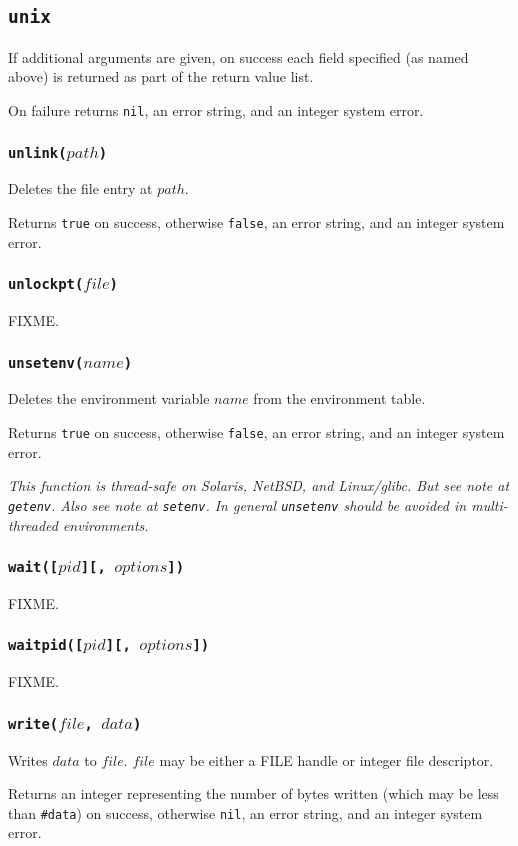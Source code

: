 \documentclass[11pt, oneside]{memoir}
\newcommand*{\true}[0]{\texttt{true}\xspace}
\newcommand*{\false}[0]{\texttt{false}\xspace}
\newcommand*{\nil}[0]{\texttt{nil}\xspace}
\newcommand*{\fn}[1]{\texttt{#1}\xspace}
\newcommand*{\otherwise}[1]{otherwise #1, an error string, and an integer system error}
\newcounter{toccols}
\newenvironment{Module}[1]{
	\subsection{\texttt{#1}}
	\addtocontents{toc}{
		\protect\begin{multicols}{\value{toccols}}
	}
}{
	\addtocontents{toc}{\protect\end{multicols}}
}
\begin{document}
\begin{Module}{unix}
If additional arguments are given, on success each field specified (as named above) is returned as part of the return value list.

On failure returns \nil, an error string, and an integer system error.

\subsubsection[\fn{unlink}]{\fn{unlink($path$)}}

Deletes the file entry at $path$.

Returns \true on success, otherwise \false, an error string, and an integer system error. 

\subsubsection[\fn{unlockpt}]{\fn{unlockpt($file$)}}

FIXME.

\subsubsection[\fn{unsetenv}]{\fn{unsetenv($name$)}}

Deletes the environment variable $name$ from the environment table.

Returns \true on success, otherwise \false, an error string, and an integer system error.

\emph{This function is thread-safe on Solaris, NetBSD, and Linux/glibc. But see note at \fn{getenv}. Also see note at \fn{setenv}. In general \fn{unsetenv} should be avoided in multi-threaded environments.}

\subsubsection[\fn{wait}]{\fn{wait([$pid$][, $options$])}}

FIXME.

\subsubsection[\fn{waitpid}]{\fn{waitpid([$pid$][, $options$])}}

FIXME.

\subsubsection[\fn{write}]{\fn{write($file$, $data$)}}

Writes $data$ to $file$. $file$ may be either a FILE handle or integer file descriptor.

Returns an integer representing the number of bytes written (which may be less than \texttt{\#data}) on success, \otherwise{\nil}.

\end{Module}
\end{document}
